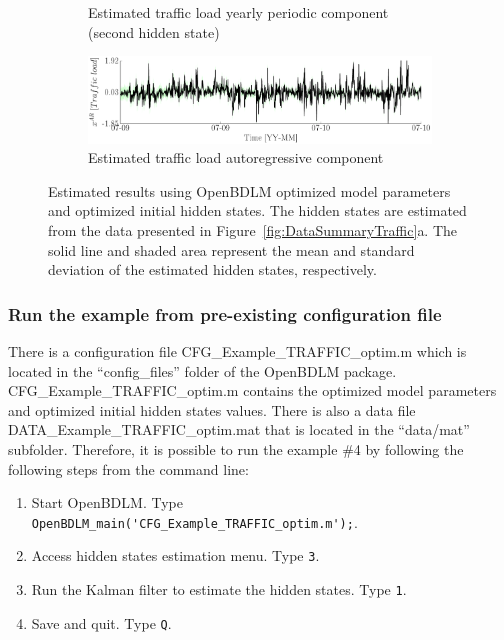 \begin{figure}[h!]
\begin{center}
\begin{subfigure}{\linewidth}
\caption{Estimated traffic load yearly periodic component (second hidden state)}
\end{subfigure}
\begin{subfigure}{\linewidth}
\includegraphics[width=0.9\linewidth]{./docfigs/Example_TRAFFIC/optim_param_optim_initialhiddenstate/TrafficLoad_AR_4.pdf} 
\caption{Estimated traffic load autoregressive component}
\end{subfigure}
\caption{Estimated results using OpenBDLM optimized model parameters and optimized initial hidden states. The hidden states are estimated from the data presented in Figure~\ref{fig:DataSummaryTraffic}a. The solid line and shaded area represent the mean and standard deviation of the estimated hidden states, respectively.}
\label{fig:Example_TrafficOptimizedOptimized}
\end{center}
\end{figure}



\subsubsection{Run the example from pre-existing configuration file}
\label{SS:LoadConfigFileTraffic}


There is a configuration file CFG\_Example\_TRAFFIC\_optim.m which is located in the ``config\_files'' folder of the OpenBDLM package.
CFG\_Example\_TRAFFIC\_optim.m contains the optimized model parameters and optimized initial hidden states values.
There is also a data file DATA\_Example\_TRAFFIC\_optim.mat that is located in the ``data/mat'' subfolder.
Therefore, it is possible to run the example \#4 by following the following steps from the \MATLAB{} command line:
\begin{enumerate}
\item Start OpenBDLM. Type \colorbox{light-gray}{\lstinline[basicstyle = \mlttfamily \small, backgroundcolor = \color{light-gray}]!OpenBDLM_main('CFG_Example_TRAFFIC_optim.m');!}.
\item Access hidden states estimation menu. Type \colorbox{light-gray}{\lstinline[basicstyle = \mlttfamily \small, backgroundcolor = \color{light-gray}]!3!}.
\item Run the Kalman filter to estimate the hidden states. Type \colorbox{light-gray}{\lstinline[basicstyle = \mlttfamily \small, backgroundcolor = \color{light-gray}]!1!}.
\item Save and quit. Type \colorbox{light-gray}{\lstinline[basicstyle = \mlttfamily \small, backgroundcolor = \color{light-gray}]!Q!}.
\end{enumerate}


